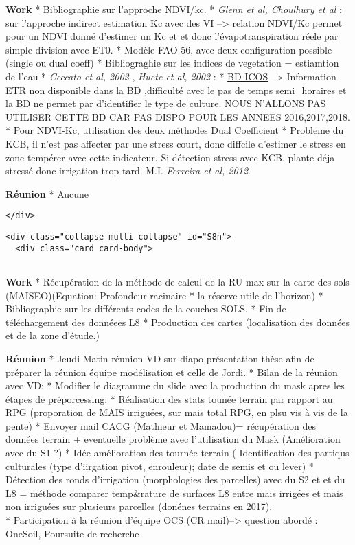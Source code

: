 \documentclass[11pt]{article}
\begin{document}
\textbf{Work} * Bibliographie sur l'approche NDVI/kc. * \emph{Glenn et
al, Choulhury et al} : sur l'approche indirect estimation Kc avec des VI
--\textgreater{} relation NDVI/Kc permet pour un NDVI donné d'estimer un
Kc et et donc l'évapotranspiration réele par simple division avec ET0. *
Modèle FAO-56, avec deux configuration possible (single ou dual coeff) *
Bibliograghie sur les indices de vegetation = estiamtion de l'eau *
\emph{Ceccato et al, 2002} , \emph{Huete et al, 2002} : *
\href{www.europe-fluxdata.eu}{BD ICOS} --\textgreater{} Information ETR
non disponible dans la BD ,difficulté avec le pas de temps
semi\_horaires et la BD ne permet par d'identifier le type de culture.
NOUS N'ALLONS PAS UTILISER CETTE BD CAR PAS DISPO POUR LES ANNEES
2016,2017,2018. * Pour NDVI-Kc, utilisation des deux méthodes Dual
Coefficient * Probleme du KCB, il n'est pas affecter par une stress
court, donc diffcile d'estimer le stress en zone tempérer avec cette
indicateur. Si détection stress avec KCB, plante déja stressé donc
irrigation trop tard. M.I. \emph{Ferreira et al, 2012}.

\textbf{Réunion} * Aucune

\begin{verbatim}
</div>
\end{verbatim}

\begin{verbatim}
<div class="collapse multi-collapse" id="S8n">
  <div class="card card-body">
      
\end{verbatim}

\textbf{Work} * Récupération de la méthode de calcul de la RU max sur la
carte des sols (MAISEO)(Equation: Profondeur racinaire * la réserve
utile de l'horizon) * Bibliographie sur les différents codes de la
couches SOLS. * Fin de téléchargement des donnéees L8 * Production des
cartes (localisation des données et de la zone d'étude.)

\textbf{Réunion} * Jeudi Matin réunion VD sur diapo présentation thèse
afin de préparer la réunion équipe modélisation et celle de Jordi. *
Bilan de la réunion avec VD: * Modifier le diagramme du slide avec la
production du mask apres les étapes de préporcessing: * Réalisation des
stats tounée terrain par rapport au RPG (proporation de MAIS irriguées,
sur mais total RPG, en plsu vis à vis de la pente) * Envoyer mail CACG
(Mathieur et Mamadou)= récupération des données terrain + eventuelle
problème avec l'utilisation du Mask (Amélioration avec du S1 ?) * Idée
amélioration des tournée terrain ( Identification des partiqus
culturales (type d'iirgation pivot, enrouleur); date de semis et ou
lever) * Détection des ronds d'irrigation (morphologies des parcelles)
avec du S2 et et du L8 = méthode comparer temp\&rature de surfaces L8
entre mais irrigées et mais non irriguées sur plusieurs parcelles
(donénes terrains en 2017).\\
* Participation à la réunion d'équipe OCS (CR mail)--\textgreater{}
question abordé : OneSoil, Poursuite de recherche
\end{document}
